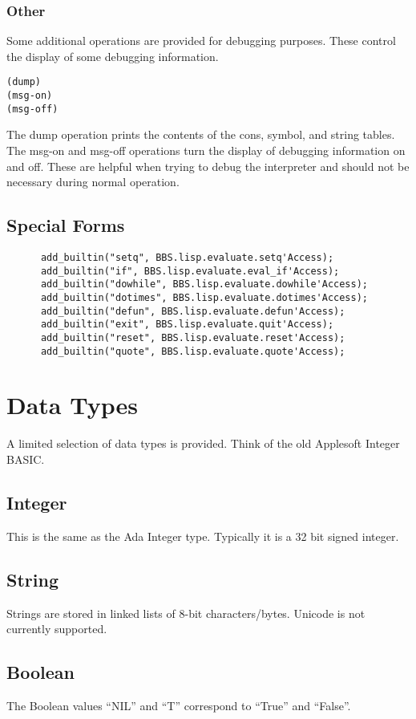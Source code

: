 \documentclass[10pt, openany]{book}
\begin{document}
\subsubsection{Other}
Some additional operations are provided for debugging purposes.  These control the display of some debugging information.
\begin{lstlisting}
(dump)
(msg-on)
(msg-off)
\end{lstlisting}

The dump operation prints the contents of the cons, symbol, and string tables.  The msg-on and msg-off operations turn the display of debugging information on and off.  These are helpful when trying to debug the interpreter and should not be necessary during normal operation.

\subsection{Special Forms}
\lstset{language=Ada}
\begin{lstlisting}
      add_builtin("setq", BBS.lisp.evaluate.setq'Access);
      add_builtin("if", BBS.lisp.evaluate.eval_if'Access);
      add_builtin("dowhile", BBS.lisp.evaluate.dowhile'Access);
      add_builtin("dotimes", BBS.lisp.evaluate.dotimes'Access);
      add_builtin("defun", BBS.lisp.evaluate.defun'Access);
      add_builtin("exit", BBS.lisp.evaluate.quit'Access);
      add_builtin("reset", BBS.lisp.evaluate.reset'Access);
      add_builtin("quote", BBS.lisp.evaluate.quote'Access);
\end{lstlisting}

\section{Data Types}
A limited selection of data types is provided.  Think of the old Applesoft Integer BASIC.

\subsection{Integer}
This is the same as the Ada Integer type.  Typically it is a 32 bit signed integer.

\subsection{String}
Strings are stored in linked lists of 8-bit characters/bytes.  Unicode is not currently supported.

\subsection{Boolean}
The Boolean values ``NIL'' and ``T'' correspond to ``True'' and ``False''.
\end{document}
